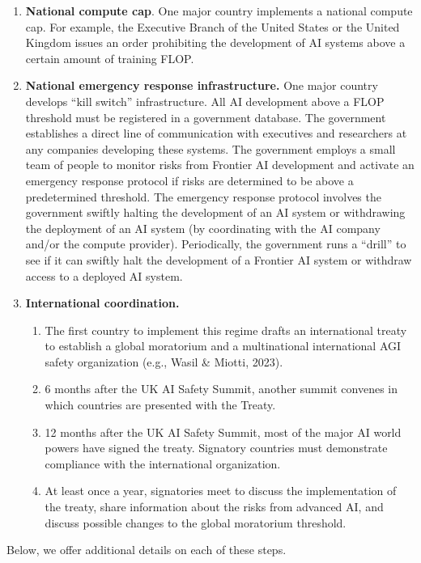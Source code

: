 \documentclass[12pt,a4paper]{article}
\begin{document}
\begin{enumerate}
\item \textbf{National compute cap}. One major country implements a national compute cap. For example, the Executive Branch of the United States or the United Kingdom issues an order prohibiting the development of AI systems above a certain amount of training FLOP. 
\item \textbf{\textbf{National emergency response infrastructure}.} One major country develops “kill switch” infrastructure. All AI development above a FLOP threshold must be registered in a government database. The government establishes a direct line of communication with executives and researchers at any companies developing these systems. The government employs a small team of people to monitor risks from Frontier AI development and activate an emergency response protocol if risks are determined to be above a predetermined threshold. The emergency response protocol involves the government swiftly halting the development of an AI system or withdrawing the deployment of an AI system (by coordinating with the AI company and/or the compute provider). Periodically, the government runs a “drill” to see if it can swiftly halt the development of a Frontier AI system or withdraw access to a deployed AI system. 
\item \textbf{\textbf{International coordination}.}
\begin{enumerate}
\item The first country to implement this regime drafts an international treaty to establish a global moratorium and a multinational international AGI safety organization (e.g., Wasil \& Miotti, 2023).
\item 6 months after the UK AI Safety Summit, another summit convenes in which countries are presented with the Treaty.
\item 12 months after the UK AI Safety Summit, most of the major AI world powers have signed the treaty. Signatory countries must demonstrate compliance with the international organization. 
\item At least once a year, signatories meet to discuss the implementation of the treaty, share information about the risks from advanced AI, and discuss possible changes to the global moratorium threshold.
\end{enumerate}

\end{enumerate}

Below, we offer additional details on each of these steps.
\end{document}
